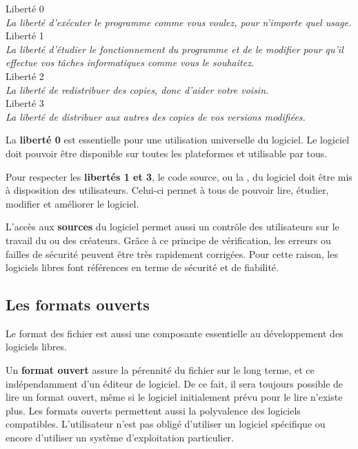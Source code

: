 \begin{center}
\begin{minipage}{0.8\textwidth}
\begin{center}
\textcolor{Cdl}{\large Liberté 0} \\ \textit{La liberté d'exécuter le programme comme vous voulez, pour n'importe quel usage.} \\
\textcolor{Cdl}{\large Liberté 1} \\ \textit{La liberté d'étudier le fonctionnement du programme et de le modifier pour qu'il effectue vos tâches informatiques comme vous le souhaitez.} \\
\textcolor{Cdl}{\large Liberté 2} \\ \textit{La liberté de redistribuer des copies, donc d'aider votre voisin.} \\
\textcolor{Cdl}{\large Liberté 3} \\ \textit{La liberté de distribuer aux autres des copies de vos versions modifiées.}
\end{center}
\end{minipage}
\end{center}

La \textbf{liberté 0} est essentielle pour une utilisation universelle du logiciel. Le logiciel doit pouvoir être disponible sur toutes les plateformes et utilisable par tous.

\Separateur

Pour respecter les \textbf{libertés 1 et 3}, le code source, ou la , du logiciel doit être mis à disposition des utilisateurs. Celui-ci permet à tous de pouvoir lire, étudier, modifier et améliorer le logiciel.

\Separateur

L’accès aux \textbf{sources} du logiciel permet aussi un contrôle des utilisateurs sur le travail du ou des créateurs. Grâce à ce principe de vérification, les erreurs ou failles de sécurité peuvent être très rapidement corrigées. Pour cette raison, les logiciels libres font références en terme de sécurité et de fiabilité.

\subsection{Les formats ouverts}

Le format des fichier est aussi une composante essentielle au développement des logiciels libres.

Un \textbf{format ouvert} assure la pérennité du fichier sur le long terme, et ce indépendamment d’un éditeur de logiciel. De ce fait, il sera toujours possible de lire un format ouvert, même si le logiciel initialement prévu pour le lire n’existe plus. Les formats ouverts permettent aussi la polyvalence des logiciels compatibles. L’utilisateur n’est pas obligé d’utiliser un logiciel spécifique ou encore d’utiliser un système d’exploitation particulier.


